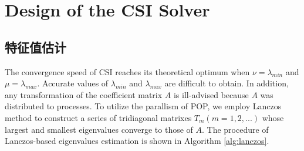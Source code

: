  
 





 
 








\section{Design of the CSI Solver} \label{se:csi}
 


\subsection{特征值估计}
The convergence speed of CSI reaches its theoretical optimum when $\nu = \lambda_{min}$ and $\mu =\lambda_{max}$. Accurate values of $\lambda_{min}$ and $\lambda_{max}$ are difficult to obtain. In addition, any transformation of the coefficient matrix $A$ is ill-advised because $A$ was distributed to processes. 
To utilize the parallism of POP, we employ Lanczos method \cite{Paige1980235} to construct a series of tridiagonal matrixes $T_m (m=1,2,...)$ whose largest and smallest eigenvalues converge to those of $A$. 
The procedure of Lanczos-based eigenvalues estimation is shown in Algorithm \ref{alg:lanczos}.
\vspace{-10pt}

